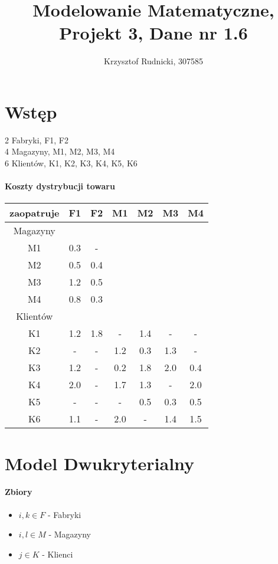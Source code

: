 \documentclass[12pt]{article}
\title{Modelowanie Matematyczne, Projekt 3, Dane nr 1.6}
\author{Krzysztof Rudnicki, 307585}
\begin{document}
\maketitle 
\section{Wstęp} 
2 Fabryki, F1, F2 \\ 
4 Magazyny, M1, M2, M3, M4 \\ 
6 Klientów, K1, K2, K3, K4, K5, K6 \\ 
\paragraph{Koszty dystrybucji towaru}

\begin{center}
    \begin{tabular}{ | c | c | c | c | c | c | c |  }
        \hline
     zaopatruje & F1 & F2 & M1 & M2 & M3 & M4  \\ 
     \hline
     Magazyny &  &  &  &  &  &   \\ 
     \hline
     M1 & 0.3 & - &  &  &  &   \\ 
     \hline
     M2 & 0.5 & 0.4 &  &  &  &   \\ 
     \hline
     M3 & 1.2 & 0.5 &  &  &  &   \\ 
     \hline
     M4 & 0.8 & 0.3 &  &  &  &   \\ 
     \hline
     Klientów &  &  & &  &  & \\ 
     \hline
     K1 & 1.2 & 1.8 & - & 1.4 & - & -    \\ 
     \hline
     K2 & - & - & 1.2 & 0.3 & 1.3 & -  \\ 
     \hline
     K3 & 1.2 & - & 0.2 & 1.8 & 2.0 & 0.4  \\ 
     \hline
     K4 & 2.0 & - & 1.7 & 1.3 & - & 2.0  \\ 
     \hline
     K5 & - & - & - & 0.5 & 0.3 & 0.5  \\ 
     \hline
     K6 & 1.1 & - & 2.0 & - & 1.4 & 1.5  \\ 
     \hline
    \end{tabular}
    \end{center}
\section{Model Dwukryterialny}
\paragraph{Zbiory}
\begin{itemize}
    \item $i, k \in F$ - Fabryki 
    \item $i, l \in M$ - Magazyny 
    \item $j \in K$ - Klienci
\end{itemize}
\end{document}

